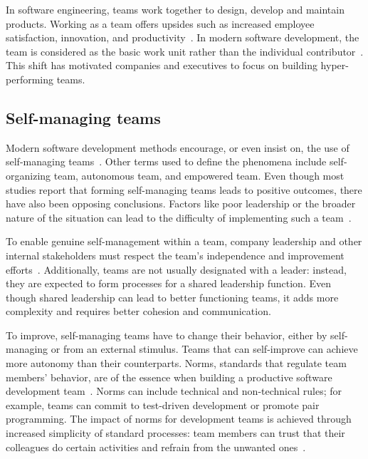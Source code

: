 In software engineering, teams work together to design, develop and maintain products. Working as a team offers upsides such as increased employee satisfaction, innovation, and productivity~\cite{moe_teamwork_2010}. In modern software development, the team is considered as the basic work unit rather than the individual contributor~\cite{moe_overcoming_2010}. This shift has motivated companies and executives to focus on building hyper-performing teams.

\subsection{Self-managing teams}

Modern software development methods encourage, or even insist on, the use of self-mana\-ging teams~\cite{moe_teamwork_2010}. Other terms used to define the phenomena include self-organizing team, autonomous team, and empowered team. Even though most studies report that forming self-managing teams leads to positive outcomes, there have also been opposing conclusions. Factors like poor leadership or the broader nature of the situation can lead to the difficulty of implementing such a team~\cite{moe_teamwork_2010}. 

To enable genuine self-management within a team, company leadership and other internal stakeholders must respect the team's independence and improvement efforts~\cite{moe_overcoming_2010}. Additionally, teams are not usually designated with a leader: instead, they are expected to form processes for a shared leadership function. Even though shared leadership can lead to better functioning teams, it adds more complexity and requires better cohesion and communication.~\cite{solansky_leadership_2008}

To improve, self-managing teams have to change their behavior, either by self-managing or from an external stimulus. Teams that can self-improve can achieve more autonomy than their counterparts. Norms, standards that regulate team members' behavior, are of the essence when building a productive software development team~\cite{abrahamsson_exploring_2016}. Norms can include technical and non-technical rules; for example, teams can commit to test-driven development or promote pair programming. The impact of norms for development teams is achieved through increased simplicity of standard processes: team members can trust that their colleagues do certain activities and refrain from the unwanted ones~\cite{abrahamsson_exploring_2016}. 

